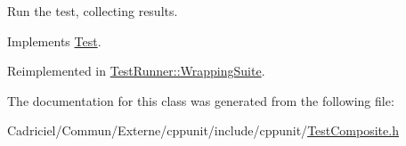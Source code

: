 Run the test, collecting results. 



Implements \hyperlink{class_test_a7beeb95dc0d058bd3bfea1a75463cb03}{Test}.



Reimplemented in \hyperlink{class_test_runner_1_1_wrapping_suite_aa486bfea64b60206ac1d8fbb006f2f64}{Test\-Runner\-::\-Wrapping\-Suite}.



The documentation for this class was generated from the following file\-:\begin{DoxyCompactItemize}
\item 
Cadriciel/\-Commun/\-Externe/cppunit/include/cppunit/\hyperlink{_test_composite_8h}{Test\-Composite.\-h}\end{DoxyCompactItemize}
